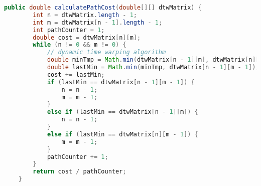 \begin{lstlisting}[language=Java, caption=Warping Path berechnen.]
    public double calculatePathCost(double[][] dtwMatrix) {
        int n = dtwMatrix.length - 1;
        int m = dtwMatrix[n - 1].length - 1;
        int pathCounter = 1;
        double cost = dtwMatrix[n][m];
        while (n != 0 && m != 0) {
            // dynamic time warping algorithm
            double minTmp = Math.min(dtwMatrix[n - 1][m], dtwMatrix[n][m - 1]);
            double lastMin = Math.min(minTmp, dtwMatrix[n - 1][m - 1]);
            cost += lastMin;
            if (lastMin == dtwMatrix[n - 1][m - 1]) {
                n = n - 1;
                m = m - 1;
            }
            else if (lastMin == dtwMatrix[n - 1][m]) {
                n = n - 1;
            }
            else if (lastMin == dtwMatrix[n][m - 1]) {
                m = m - 1;
            }
            pathCounter += 1;
        }
        return cost / pathCounter;
    }
\end{lstlisting}

